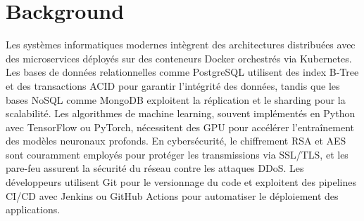 
\chapter{Background}
\label{chapter:background}

Les systèmes informatiques modernes intègrent des architectures distribuées avec des microservices déployés sur des conteneurs Docker orchestrés via Kubernetes. Les bases de données relationnelles comme PostgreSQL utilisent des index B-Tree et des transactions ACID pour garantir l'intégrité des données, tandis que les bases NoSQL comme MongoDB exploitent la réplication et le sharding pour la scalabilité. Les algorithmes de machine learning, souvent implémentés en Python avec TensorFlow ou PyTorch, nécessitent des GPU pour accélérer l'entraînement des modèles neuronaux profonds. En cybersécurité, le chiffrement RSA et AES sont couramment employés pour protéger les transmissions via SSL/TLS, et les pare-feu assurent la sécurité du réseau contre les attaques DDoS. Les développeurs utilisent Git pour le versionnage du code et exploitent des pipelines CI/CD avec Jenkins ou GitHub Actions pour automatiser le déploiement des applications.

